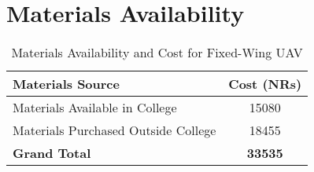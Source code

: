 \section*{Materials Availability}
\begin{table}[h]
\centering
\begin{tabular}{l S[table-format=5.0]}
\toprule
\textbf{Materials Source} & \textbf{Cost (NRs)} \\
\midrule
Materials Available in College & 15080 \\
Materials Purchased Outside College & 18455 \\
\midrule
\textbf{Grand Total} & \textbf{33535} \\
\bottomrule
\end{tabular}
\caption{Materials Availability and Cost for Fixed-Wing UAV}
\end{table}

